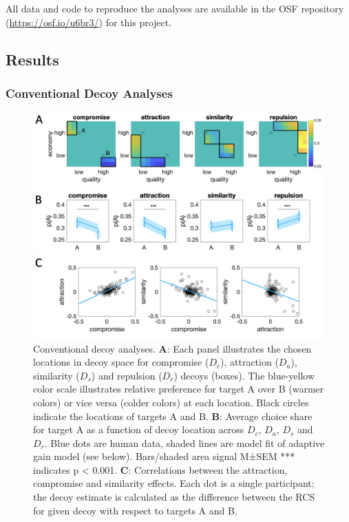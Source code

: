 \documentclass[a4paper, nobind]{templates/ociamthesis}
\begin{document}
All data and code to reproduce the analyses are available in the OSF repository (\url{https://osf.io/u6br3/}) for this project.

\hypertarget{results}{%
\subsection{Results}\label{results}}

\hypertarget{conventional-decoy-analyses-1}{%
\subsubsection{Conventional Decoy Analyses}\label{conventional-decoy-analyses-1}}

\begin{figure}

{\centering \includegraphics[width=1\linewidth]{figures/decoy-classic} 

}

\caption[Conventional decoy analyses]{Conventional decoy analyses. $\textbf{A:}$ Each panel illustrates the chosen locations in decoy space for compromise ($D_c$), attraction ($D_a$), similarity ($D_s$) and repulsion ($D_r$) decoys (boxes). The blue-yellow color scale illustrates relative preference for target A over B (warmer colors) or vice versa (colder colors) at each location. Black circles indicate the locations of targets A and B.  $\textbf{B:}$ Average choice share for target A as a function of decoy location across $D_c$, $D_a$, $D_s$ and $D_r$. Blue dots are human data, shaded lines are model fit of adaptive gain model (see below). Bars/shaded area signal M±SEM *** indicates p < 0.001. $\textbf{C:}$ Correlations between the attraction, compromise and similarity effects. Each dot is a single participant; the decoy estimate is calculated as the difference between the RCS for given decoy with respect to targets A and B. }\label{fig:decoy-classic}
\end{figure}
\end{document}

